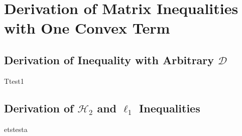 
\chapter{Derivation of Matrix Inequalities with One Convex Term}
\label{sec:apd-a}

\section{Derivation of  Inequality with Arbitrary $\mathcal{D}$}
\label{sec:apd-a-1}

Ttest1

\section{Derivation of $\mathcal{H}_2$ and $\ell_1$ Inequalities}
\label{sec:apd-a-2}

etstesta 